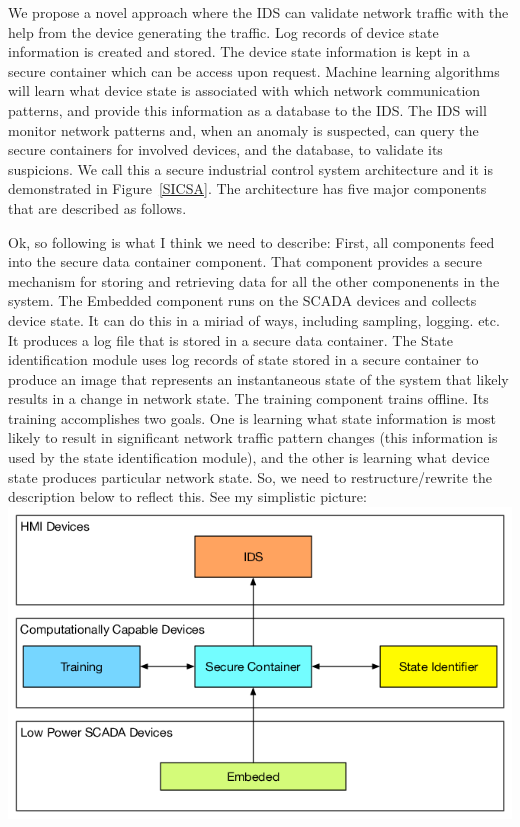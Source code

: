 \documentclass[conference]{IEEEtran}
\begin{document}
We propose a novel approach where the IDS can validate network traffic with the help from the device generating the traffic.  Log records of device state information is created and stored. The device state information is kept in a secure container which can be access upon request. Machine learning algorithms will learn what device state is associated with which network communication patterns, and provide this information as a database to the IDS. The IDS will monitor network patterns and, when an anomaly is suspected, can query the secure containers for involved devices, and the database, to validate its suspicions. We call this a secure industrial control system architecture and it is demonstrated in Figure~\ref{SICSA}. 
The architecture has five major components that are described as follows.


{\color{red} Ok, so following is what I think we need to describe:  First, all components feed into the secure data container component.  That component provides a secure mechanism for storing and retrieving data for all the other componenents in the system.  The  Embedded component runs on the SCADA devices and collects device state.  It can do this in a miriad of ways, including sampling, logging. etc.  It produces a log file that is stored in a secure data container.  The State identification module uses log records of state stored in a secure container to produce an image that represents an instantaneous state of the system that likely results in a change in network state.  The training component trains  offline.  Its training accomplishes two goals.  One is learning what state information is most likely to result in significant network traffic pattern changes (this information is used by the state identification module), and the other is learning what device state produces particular network state. So, we need to restructure/rewrite the description below to reflect this.  See my simplistic picture:}
\includegraphics [width=.5\textwidth]{secscada.png}
\end{document}
